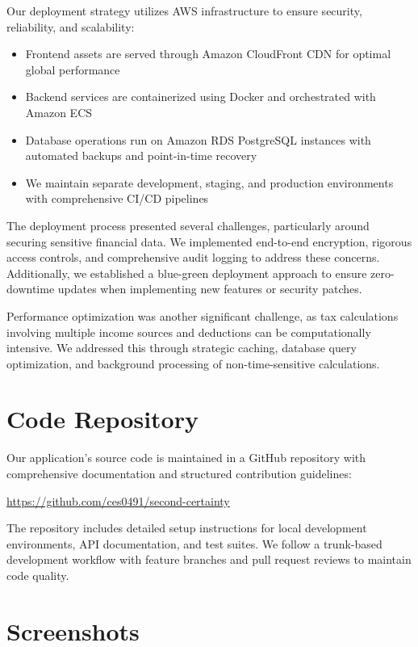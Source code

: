 \documentclass[
  11pt,
  letterpaper,
]{article}
\providecommand{\tightlist}{%
  \setlength{\itemsep}{0pt}\setlength{\parskip}{0pt}}\usepackage{longtable,booktabs,array}
\begin{document}
Our deployment strategy utilizes AWS infrastructure to ensure security,
reliability, and scalability:

\begin{itemize}
\tightlist
\item
  Frontend assets are served through Amazon CloudFront CDN for optimal
  global performance
\item
  Backend services are containerized using Docker and orchestrated with
  Amazon ECS
\item
  Database operations run on Amazon RDS PostgreSQL instances with
  automated backups and point-in-time recovery
\item
  We maintain separate development, staging, and production environments
  with comprehensive CI/CD pipelines
\end{itemize}

The deployment process presented several challenges, particularly around
securing sensitive financial data. We implemented end-to-end encryption,
rigorous access controls, and comprehensive audit logging to address
these concerns. Additionally, we established a blue-green deployment
approach to ensure zero-downtime updates when implementing new features
or security patches.

Performance optimization was another significant challenge, as tax
calculations involving multiple income sources and deductions can be
computationally intensive. We addressed this through strategic caching,
database query optimization, and background processing of
non-time-sensitive calculations.

\hypertarget{code-repository}{%
\section{Code Repository}\label{code-repository}}

Our application's source code is maintained in a GitHub repository with
comprehensive documentation and structured contribution guidelines:

\url{https://github.com/ces0491/second-certainty}

The repository includes detailed setup instructions for local
development environments, API documentation, and test suites. We follow
a trunk-based development workflow with feature branches and pull
request reviews to maintain code quality.

\hypertarget{screenshots}{%
\section{Screenshots}\label{screenshots}}
\end{document}
